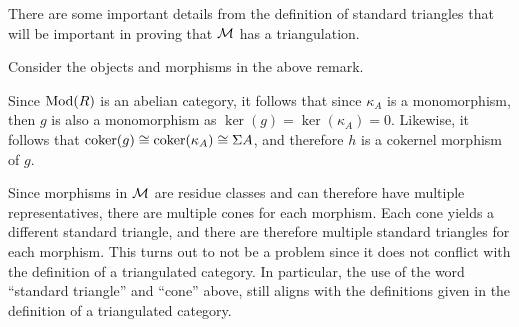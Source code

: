 There are some important details from the definition of standard triangles that will be important in proving that \( {\mathcal{M}} \) has a triangulation.

\begin{remark}
    \label{rem:stmod_cone_pushout_properties}
    Consider the objects and morphisms in the above remark.

    Since \( \operatorname{Mod}(R) \) is an abelian category, it follows that since \( \kappa_A \) is a monomorphism, then \( g \) is also a monomorphism as \( \ker(g) = \ker(\kappa_A) = 0 \). Likewise, it follows that \( \operatorname{coker}(g) \cong \operatorname{coker}(\kappa_A) \cong \Sigma A \), and therefore \( h \) is a cokernel morphism of \( g \).
\end{remark}

Since morphisms in \( {\mathcal{M}} \) are residue classes and can therefore have multiple representatives, there are multiple cones for each morphism. Each cone yields a different standard triangle, and there are therefore multiple standard triangles for each morphism. This turns out to not be a problem since it does not conflict with the definition of a triangulated category. In particular, the use of the word ``standard triangle'' and ``cone'' above, still aligns with the definitions given in the definition of a triangulated category.

